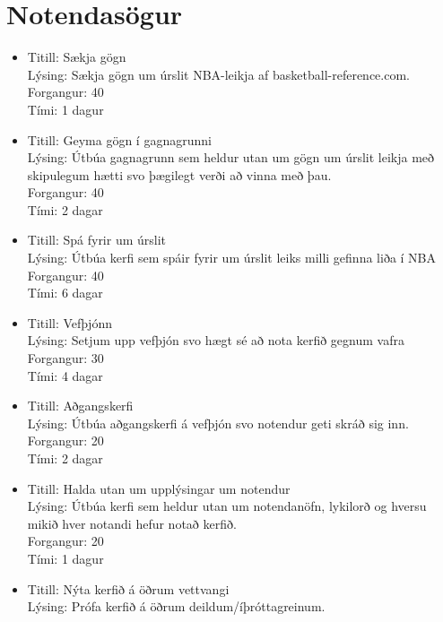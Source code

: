 \documentclass[a4paper,11pt]{article}
\begin{document}
\section{Notendasögur}
\begin{itemize}
\item Titill: Sækja gögn\\
  Lýsing: Sækja gögn um úrslit NBA-leikja af basketball-reference.com.\\
  Forgangur: 40\\
  Tími: 1 dagur\\
\item
  Titill: Geyma gögn í gagnagrunni\\
  Lýsing: Útbúa gagnagrunn sem heldur utan um gögn um úrslit leikja með skipulegum hætti svo þægilegt verði að vinna með þau.\\
  Forgangur: 40\\
  Tími: 2 dagar\\
\item
  Titill: Spá fyrir um úrslit\\
  Lýsing: Útbúa kerfi sem spáir fyrir um úrslit leiks milli gefinna liða í NBA\\
  Forgangur: 40\\
  Tími: 6 dagar\\
\item
  Titill: Vefþjónn\\
  Lýsing: Setjum upp vefþjón svo hægt sé að nota kerfið gegnum vafra\\
  Forgangur: 30\\
  Tími: 4 dagar\\
\item
  Titill: Aðgangskerfi\\
  Lýsing: Útbúa aðgangskerfi á vefþjón svo notendur geti skráð sig inn.\\
  Forgangur: 20\\
  Tími: 2 dagar\\
\item
  Titill: Halda utan um upplýsingar um notendur\\
  Lýsing: Útbúa kerfi sem heldur utan um notendanöfn, lykilorð og hversu mikið hver notandi hefur notað kerfið.\\
  Forgangur: 20\\
  Tími: 1 dagur\\
\item
  Titill: Nýta kerfið á öðrum vettvangi\\
  Lýsing: Prófa kerfið á öðrum deildum/íþróttagreinum.\\

\end{itemize}
\end{document}

